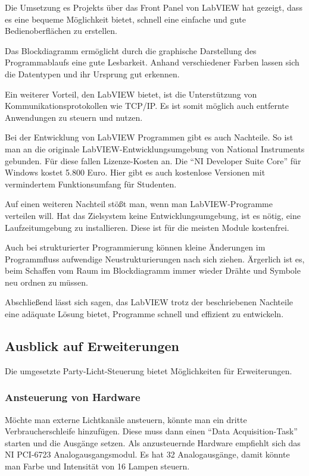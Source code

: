 Die Umsetzung es Projekts über das Front Panel von LabVIEW hat gezeigt, dass es eine bequeme Möglichkeit bietet, schnell eine einfache und  gute Bedienoberflächen zu erstellen.


Das Blockdiagramm ermöglicht durch die graphische Darstellung des Programmablaufs eine gute Lesbarkeit.
Anhand verschiedener Farben lassen sich die Datentypen und ihr Ursprung gut erkennen.

Ein weiterer Vorteil, den LabVIEW bietet, ist die Unterstützung von Kommunikationsprotokollen wie TCP/IP. 
Es ist somit möglich auch  entfernte Anwendungen zu steuern und nutzen.

Bei der Entwicklung von LabVIEW Programmen gibt es auch Nachteile.
So ist man an die originale LabVIEW-Entwicklungsumgebung von National Instruments gebunden. Für diese fallen Lizenze-Kosten an. Die "`NI Developer Suite Core"' für Windows kostet 5.800 Euro.
Hier gibt es auch kostenlose Versionen mit vermindertem Funktionsumfang für Studenten. \cite{ni-kost}

Auf einen weiteren Nachteil stößt man, wenn man LabVIEW-Programme verteilen will. Hat das Zielsystem keine Entwicklungsumgebung, ist es nötig, eine Laufzeitumgebung zu installieren.
Diese ist für die meisten Module kostenfrei.

Auch bei strukturierter Programmierung können kleine Änderungen im Programmfluss  aufwendige Neustrukturierungen nach sich ziehen. 
Ärgerlich ist es, beim Schaffen vom Raum im Blockdiagramm immer wieder Drähte und Symbole neu ordnen zu müssen.

Abschließend lässt sich sagen, das LabVIEW trotz der beschriebenen Nachteile eine adäquate Lösung bietet, Programme schnell und effizient zu entwickeln. %


	
\subsection{Ausblick auf Erweiterungen}
Die umgesetzte Party-Licht-Steuerung bietet Möglichkeiten für Erweiterungen.

\subsubsection{Ansteuerung von Hardware}
Möchte man externe Lichtkanäle ansteuern, könnte man ein dritte Verbraucherschleife hinzufügen. 
Diese muss dann einen "`Data Acquisition-Task"' starten und die Ausgänge setzen. 
Als anzusteuernde Hardware empfiehlt sich das NI PCI-6723 Analogausgangsmodul. 
Es hat 32 Analogausgänge, damit könnte man  Farbe und Intensität von 16 Lampen steuern.\cite{ni-pci}

